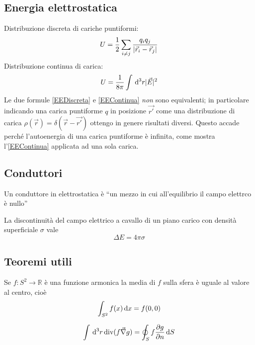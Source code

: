 \documentclass[../main.tex]{subfiles}
\begin{document}
\subsection{Energia elettrostatica}\label{EnergiaElettrostatica}
Distribuzione discreta di cariche puntiformi:
\begin{equation}
	\label{EEDiscreta}
	U= \frac{1}{2} \sum_{i\neq j} \frac{q_iq_j}{\lvert\vec r_i -\vec r_j\rvert}
\end{equation}
Distribuzione continua di carica:
\begin{equation}
	\label{EEContinua}
	U= \frac{1}{8\pi} \int \,\mathrm d^3 r \lvert\vec E\rvert^2
\end{equation}
Le due formule \cref{EEDiscreta} e \cref{EEContinua} \emph{non} sono equivalenti; in particolare indicando una carica puntiforme $q$ in posizione $\vec {r'}$ come una distribuzione di carica $\rho(\vec r)=\delta(\vec r - \vec {r'})$ ottengo in genere risultati diversi. Questo accade perch\'e l'autoenergia di una carica puntiforme \`e infinita, come mostra l'\cref{EEContinua} applicata ad una sola carica.

\subsection{Conduttori}\label{Conduttori}
\begin{definition}[conduttore]
  Un conduttore in elettrostatica \`e ``un mezzo in cui all'equilibrio il campo elettrco \`e nullo'' 
\end{definition}
La discontinuit\`a del campo elettrico a cavallo di un piano carico con densit\`a superficiale $\sigma$ vale
\begin{equation}
  \label{DiscontinuitaSigma}
  \Delta E = 4 \pi \sigma
\end{equation}

\subsection{Teoremi utili}\label{Teoremi}
\begin{theorem}
  Se $f:S^2 \to \mathbb{R}$ \`e una funzione armonica la media di $f$ sulla sfera \`e uguale al valore al centro, cio\`e
  \begin{equation}
    \int_{S^2} f(x) \,\mathrm d x = f(0,0)
  \end{equation}
\end{theorem}
\begin{theorem}
  \begin{equation}
    \int \,\mathrm d^3 r \operatorname{div}(f \vec \nabla g) = \oint_S f \frac{\partial g}{\partial n} \,\mathrm d S
  \end{equation}
\end{theorem}
\end{document}
